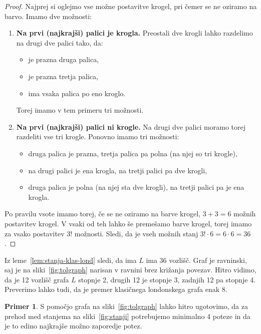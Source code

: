 \documentclass[12pt,a4paper]{amsart}
\theoremstyle{definition} %
\newtheorem{primer}[definicija]{Primer}
\theoremstyle{plain} %
\begin{document}
\begin{proof}
    Najprej si oglejmo vse možne postavitve krogel, pri čemer se ne oziramo na barvo.
    Imamo dve možnosti:
    \begin{enumerate}
        \item \textbf{Na prvi (najkrajši) palici je krogla.}
        Preostali dve krogli lahko razdelimo na drugi dve palici tako, da:
        \begin{itemize}[label={-}]
            \item je prazna druga palica,
            \item je prazna tretja palica,
            \item ima vsaka palica po eno kroglo.
        \end{itemize}
        Torej imamo v tem primeru tri možnosti.
        
        \item \textbf{Na prvi (najkrajši) palici ni krogle.}
        Na drugi dve palici moramo torej razdeliti vse tri krogle.
        Ponovno imamo tri možnosti:
        \begin{itemize}[label={-}]
            \item druga palica je prazna, tretja palica pa polna (na njej so tri krogle),
            \item na drugi palici je ena krogla, na tretji palici pa dve krogli,
            \item druga palica je polna (na njej sta dve krogli), na tretji palici pa je ena krogla.
        \end{itemize}
    \end{enumerate}
    Po pravilu vsote imamo torej, če se ne oziramo na barve krogel, $3+3=6$ možnih postavitev krogel.
    V vsaki od teh lahko še premešamo barve krogel, torej imamo za vsako postavitev $3!$ možnosti. Sledi, da je vseh možnih stanj $3! \cdot 6 = 6 \cdot 6 = 36$.\qedhere
\end{proof}

Iz leme~\ref{lem:stanja-klas-lond} sledi, da ima $L$ ima 36 vozlišč. Graf je ravninski, saj je na sliki~\ref{fig:tolgraph} narisan v ravnini brez križanja povezav. Hitro vidimo, da je 12 vozlišč grafa $L$ stopnje 2, drugih 12 je stopnje 3, zadnjih 12 pa stopnje 4. Preverimo lahko tudi, da je premer klasičnega londonskega grafa enak 8.

\begin{primer}
    S pomočjo grafa na sliki~\ref{fig:tolgraph} lahko hitro ugotovimo, da za prehod med stanjema na sliki~\ref{fig:stanji} potrebujemo minimalno 4 poteze in da je to edino najkrajše možno zaporedje potez.
\end{primer}
\end{document}
